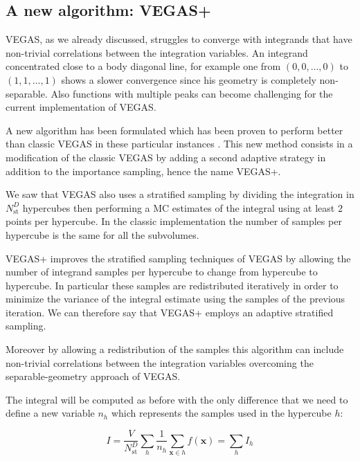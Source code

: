 \documentclass[../main/main.tex]{subfiles}
\begin{document}
\subsection{A new algorithm: VEGAS+}
\label{vegas+}
VEGAS, as we already discussed, struggles to converge with integrands that have non-trivial correlations between the integration variables. An integrand concentrated close to a body diagonal line, for example one from 
$(0,0,\dots,0)$ to $(1,1,\dots,1)$ shows a slower convergence since his geometry is completely non-separable. 
Also functions with multiple peaks can become challenging for the current implementation of VEGAS.

A new algorithm has been formulated which has been proven to perform better than classic VEGAS in these particular instances \cite{Lepage:2020tgj}.
This new method consists in a modification of the classic VEGAS by adding a second adaptive strategy in addition to the importance sampling, hence the name VEGAS+.

We saw that VEGAS also uses a stratified sampling by dividing the integration in $N_\text{st}^D$ hypercubes then performing a MC estimates of 
the integral using at least $2$ points per hypercube. In the classic implementation the number of samples per hypercube is the same for all the 
subvolumes.

VEGAS+ improves the stratified sampling techniques of VEGAS by allowing the number of integrand samples per hypercube to change from hypercube to hypercube. In particular these samples are redistributed iteratively in order to minimize the variance of the integral estimate using the 
samples of the previous iteration. We can therefore say that VEGAS+ employs an adaptive stratified sampling.

Moreover by allowing a redistribution of the samples this algorithm can include non-trivial correlations between the integration variables overcoming the separable-geometry approach of VEGAS.


The integral will be computed as before with the only difference that we need to define a new variable $n_h$ which represents the samples used 
in the hypercube $h$:

\begin{equation}
	I = \frac{V}{N_\text{st}^D}\sum_h \frac{1}{n_h} \sum_{\textbf{x} \in h} f(\textbf{x})  = \sum_h I_h
\end{equation}
\end{document}
